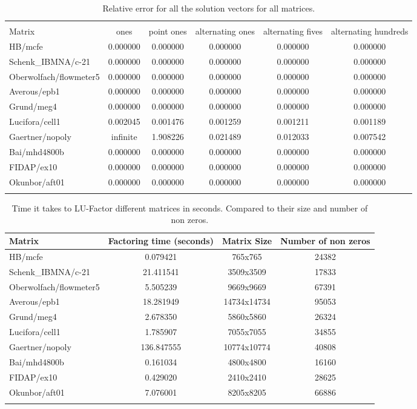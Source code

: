 \documentclass[10pt]{article}
\begin{document}
\begin{table}
    \begin{tabular}{ l c c c c c }
    \firsthline
    \multicolumn{6}{c}{Relative Error (seconds)} \\
    \cline{2-6}
    Matrix & ones & point ones & alternating ones & alternating fives & alternating hundreds \\
    \hline
    HB/mcfe & 0.000000 & 0.000000 & 0.000000 & 0.000000 & 0.000000 \\
    Schenk\_IBMNA/c-21 & 0.000000 & 0.000000 & 0.000000 & 0.000000 & 0.000000 \\
    Oberwolfach/flowmeter5 & 0.000000 & 0.000000 & 0.000000 & 0.000000 & 0.000000 \\
    Averous/epb1 & 0.000000 & 0.000000 & 0.000000 & 0.000000 & 0.000000 \\
    Grund/meg4 & 0.000000 & 0.000000 & 0.000000 & 0.000000 & 0.000000 \\
    Lucifora/cell1 & 0.002045 & 0.001476 & 0.001259 & 0.001211 & 0.001189 \\
    Gaertner/nopoly & infinite & 1.908226 & 0.021489 & 0.012033 & 0.007542 \\
    Bai/mhd4800b & 0.000000 & 0.000000 & 0.000000 & 0.000000 & 0.000000 \\
    FIDAP/ex10 & 0.000000 & 0.000000 & 0.000000 & 0.000000 & 0.000000 \\
    Okunbor/aft01 & 0.000000 & 0.000000 & 0.000000 & 0.000000 & 0.000000 \\
    \lasthline
    \end{tabular}
    \caption{Relative error for all the solution vectors for all matrices.}
    \label{tab:errors}
\end{table}

\begin{table}
    \begin{tabular}{ l c c c }
    \firsthline
    Matrix & Factoring time (seconds) & Matrix Size & Number of non zeros \\
    \hline
    HB/mcfe & 0.079421 & 765x765 & 24382\\
    Schenk\_IBMNA/c-21 & 21.411541 & 3509x3509 & 17833\\
    Oberwolfach/flowmeter5 & 5.505239 & 9669x9669 & 67391\\
    Averous/epb1 & 18.281949 & 14734x14734 & 95053\\
    Grund/meg4 & 2.678350 & 5860x5860 & 26324\\
    Lucifora/cell1 & 1.785907 & 7055x7055 & 34855\\
    Gaertner/nopoly & 136.847555 & 10774x10774 & 40808\\
    Bai/mhd4800b & 0.161034 & 4800x4800 & 16160\\
    FIDAP/ex10 & 0.429020 & 2410x2410 & 28625\\
    Okunbor/aft01 & 7.076001 & 8205x8205 & 66886\\
    \lasthline
    \end{tabular}
    \caption{Time it takes to LU-Factor different matrices in seconds. Compared to their size and number of non zeros.}
    \label{tab:factoring}
\end{table}
\end{document}
